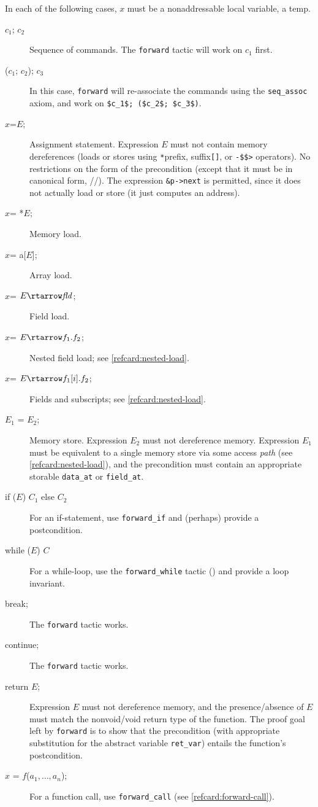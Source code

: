 \documentclass[12pt,fleqn,openany,oneside,showtrims]{memoir}
\begin{document}
In each of the following cases, $x$ must be a nonaddressable local variable,
a \textsf{temp}.
\begin{description}
\item[\textsf{$c_1$; $c_2$}] Sequence of commands.
The \lstinline{forward} tactic will work on $c_1$ first.

\item[\textsf{($c_1$; $c_2$); $c_3$}] In this case,
\lstinline{forward} will re-associate the commands
using the \lstinline{seq_assoc} axiom, and work on
\lstinline{$c_1$; ($c_2$; $c_3$)}.

\item[\textsf{$x$=$E$;}]  Assignment statement.
Expression $E$ must not contain memory dereferences (loads or stores
using \lstinline{*}prefix, suffix\lstinline{[]},
or \lstinline{-$$>} operators).
No restrictions on the form of the precondition (except that it must be in canonical form, \PROP/\LOCAL/\SEP).  The expression \lstinline{&p->next}
is permitted, since it does not actually
load or store (it just computes an address).

\item[\textsf{$x$= *$E$;}] Memory load.
\item[\textsf{$x$= a[$E$];}]  Array load.
\item[\textsf{$x$= $E\rtarrow \mathit{fld}$;}] Field load.
\item[\textsf{$x$= $E\rtarrow f_1.f_2$;}] Nested field load;
  see \autoref{refcard:nested-load}.
\item[\textsf{$x$= $E\rtarrow f_1[i].f_2$;}] Fields and subscripts;
  see \autoref{refcard:nested-load}.
\item[\textsf{$E_1$ = $E_2$;}]  Memory store.
  Expression $E_2$ must not dereference memory.
  Expression $E_1$ must be equivalent to a single memory store
  via some access \emph{path} (see \autoref{refcard:nested-load}),
  and the precondition must contain
  an appropriate storable \lstinline{data_at} or
  \lstinline{field_at}.
\item[\textsf{if ($E$) $C_1$ else $C_2$}]
For an if-statement, use \lstinline{forward_if} and (perhaps) provide a postcondition.
\item[\textsf{while} ($E$) $C$]
For a while-loop, use the \lstinline{forward_while} tactic
() and provide a loop invariant.
\item[\textsf{break};]
The \lstinline{forward} tactic works.
\item[\textsf{continue};]
The \lstinline{forward} tactic works.
\item[\textsf{return} $E$;]
Expression $E$ must not dereference memory, and
the presence/absence of $E$ must
match the nonvoid/void return type of the function.
The proof goal left by \lstinline{forward} is to
show that the precondition (with appropriate substitution
for the abstract variable \lstinline{ret_var}) entails
the function's postcondition.

\item[\textsf{$x$ = $f$($a_1, \ldots, a_n$);}]
For a function call, use \lstinline|forward_call|
(see \autoref{refcard:forward-call}).
\end{description}
\end{document}
